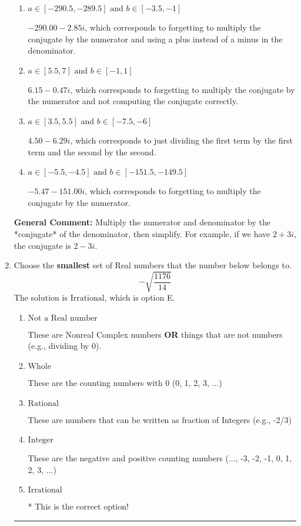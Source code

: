 \documentclass{extbook}[14pt]
\newcommand{\litem}[1]{\item #1

\rule{\textwidth}{0.4pt}}
\begin{document}
\begin{enumerate}
{\begin{enumerate}[label=\Alph*.]
* $-5.47  - 2.85 i$, which is the correct option.
\item \( a \in [-290.5, -289.5] \text{ and } b \in [-3.5, -1] \)

 $-290.00  - 2.85 i$, which corresponds to forgetting to multiply the conjugate by the numerator and using a plus instead of a minus in the denominator.
\item \( a \in [5.5, 7] \text{ and } b \in [-1, 1] \)

 $6.15  - 0.47 i$, which corresponds to forgetting to multiply the conjugate by the numerator and not computing the conjugate correctly.
\item \( a \in [3.5, 5.5] \text{ and } b \in [-7.5, -6] \)

 $4.50  - 6.29 i$, which corresponds to just dividing the first term by the first term and the second by the second.
\item \( a \in [-5.5, -4.5] \text{ and } b \in [-151.5, -149.5] \)

 $-5.47  - 151.00 i$, which corresponds to forgetting to multiply the conjugate by the numerator.
\end{enumerate}

\textbf{General Comment:} Multiply the numerator and denominator by the *conjugate* of the denominator, then simplify. For example, if we have $2+3i$, the conjugate is $2-3i$.
}
\litem{
Choose the \textbf{smallest} set of Real numbers that the number below belongs to.
\[ -\sqrt{\frac{1176}{14}} \]The solution is \( \text{Irrational} \), which is option E.\begin{enumerate}[label=\Alph*.]
\item \( \text{Not a Real number} \)

These are Nonreal Complex numbers \textbf{OR} things that are not numbers (e.g., dividing by 0).
\item \( \text{Whole} \)

These are the counting numbers with 0 (0, 1, 2, 3, ...)
\item \( \text{Rational} \)

These are numbers that can be written as fraction of Integers (e.g., -2/3)
\item \( \text{Integer} \)

These are the negative and positive counting numbers (..., -3, -2, -1, 0, 1, 2, 3, ...)
\item \( \text{Irrational} \)

* This is the correct option!
\end{enumerate}

}
\end{enumerate}
\end{document}
